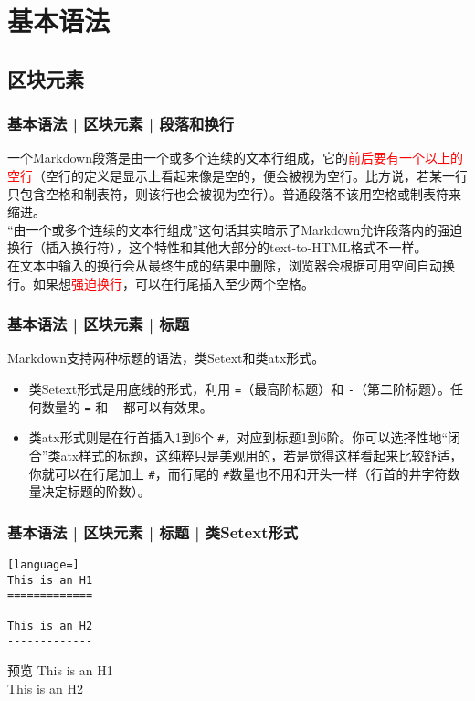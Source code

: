 \section{基本语法}
\subsection{区块元素}
\begin{frame}
  \frametitle{基本语法 | 区块元素 | 段落和换行}
一个Markdown段落是由一个或多个连续的文本行组成，它的\textcolor{red}{前后要有一个以上的空行}（空行的定义是显示上看起来像是空的，便会被视为空行。比方说，若某一行只包含空格和制表符，则该行也会被视为空行）。普通段落不该用空格或制表符来缩进。\\
  \vspace{1em}
“由一个或多个连续的文本行组成”这句话其实暗示了Markdown允许段落内的强迫换行（插入换行符），这个特性和其他大部分的text-to-HTML格式不一样。\\
  \vspace{1em}
在文本中输入的换行会从最终生成的结果中删除，浏览器会根据可用空间自动换行。如果想\textcolor{red}{强迫换行}，可以在行尾插入至少两个空格。
\end{frame}

\begin{frame}[fragile]
  \frametitle{基本语法 | 区块元素 | 标题}
  Markdown支持两种标题的语法，类Setext和类atx形式。
  \begin{itemize}
    \item 类Setext形式是用底线的形式，利用 \verb|=|（最高阶标题）和 \verb|-|（第二阶标题）。任何数量的 \verb|=| 和 \verb|-| 都可以有效果。
    \item 类atx形式则是在行首插入1到6个 \verb|#|，对应到标题1到6阶。你可以选择性地“闭合”类atx样式的标题，这纯粹只是美观用的，若是觉得这样看起来比较舒适，你就可以在行尾加上 \verb|#|，而行尾的 \verb|#|数量也不用和开头一样（行首的井字符数量决定标题的阶数）。
  \end{itemize}
\end{frame}

\begin{frame}[fragile]
  \frametitle{基本语法 | 区块元素 | 标题 | 类Setext形式}
\begin{lstlisting}[language=]
This is an H1
=============

This is an H2
-------------
\end{lstlisting}
\pause
\begin{block}{预览}
{\LARGE This is an H1}\\
{\Large This is an H2}
\end{block}
\end{frame}

